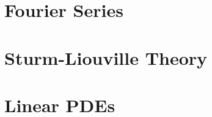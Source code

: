 \documentclass[british,11pt,a4paper]{report}
\begin{document}
\maketitle
\tableofcontents

\chapter{Fourier Series}

\chapter{Sturm-Liouville Theory}

\chapter{Linear PDEs}

\end{document}
